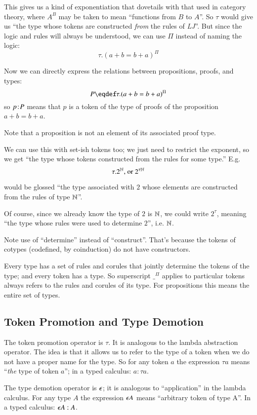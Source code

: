 \documentclass{article}
\begin{document}
This gives us a kind of exponentiation that dovetails with that used
in category theory, where \(A^B\) may be taken to mean ``functions
from \(B\) to \(A\)''. So \(\tau\) would give us ``the type whose
tokens are constructed \textit{from} the rules of \textsf{\slshape
  LJ}''. But since the logic and rules will always be understood, we
can use \(\Pi\) instead of naming the logic:
\[\tau.(a+b=b+a)^{\Pi}\]

Now we can directly express the relations between propositions,
proofs, and types:
\[P\defeq\tau.(a+b=b+a)^{\Pi}\]
so \(p\hspace{1pt}\mathpunct{:}\hspace{-1pt}P\) means that \(p\) is a token of the type of proofs of
the proposition \(a+b=b+a\).

Note that a proposition is not an element of its associated proof
type.

We can use this with set-ish tokens too; we just need to restrict the
exponent, so we get ``the type whose tokens constructed from the rules
for some type.''  E.g.
\[\tau.2^{\mathbb{N}}\text{, or } 2^{\tau\mathbb{N}}\]

would be glossed ``the type associated with \(2\) whose elements are
constructed from the rules of type \(\mathbb{N}\)''.

Of course, since we already know the type of \(2\) is \(\mathbb{N}\), we
could write \(2^{\tau}\), meaning ``the type whose rules were used to
determine \(2\)'', i.e. \(\mathbb{N}\).

Note use of ``determine'' instead of ``construct''. That's because the
tokens of cotypes (codefined, by coinduction) do not have
constructors.

Every type has a set of rules and corules that jointly determine the
tokens of the type; and every token has a type. So superscript
\(\_^{\Pi}\) applies to particular tokens always refers to the rules
and corules of its type. For propositions this means the entire set of
types.

\subsection{Token Promotion and Type Demotion}

The token promotion operator is \(\tau\).  It is analogous to the
lambda abstraction operator. The idea is that it allows us to refer
to the type of a token when we do not have a proper name for the type.
So for any token \(a\) the expression \(\tau a\) means ``\textit{the} type of
token \(a\)''; in a typed calculus: \(a: \tau a\).

The type demotion operator is \(\epsilon\); it is analogous to
``application'' in the lambda calculus. For any type \(A\) the
expression \(\epsilon A\) means ``arbitrary token of type A''. In a
typed calculus: \(\epsilon A: A\).
\end{document}
